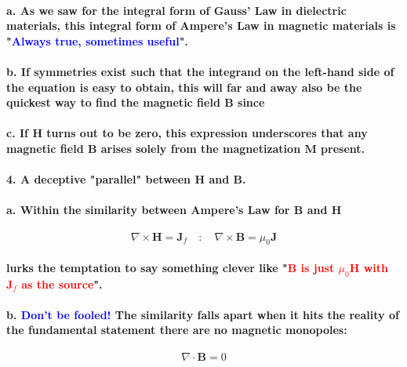 \documentclass{article}
\begin{document}
\paragraph{\indent a. As we saw for the integral form of Gauss' Law in dielectric materials, this integral form of Ampere's Law in magnetic materials is "\textcolor{blue}{Always true, sometimes useful}".}
\paragraph{\indent b. If symmetries exist such that the integrand on the left-hand side of the equation is easy to obtain, this will far and away also be the quickest way to find the magnetic field $\boldsymbol{B}$ since}
\paragraph{\indent c. If $\boldsymbol{H}$ turns out to be zero, this expression underscores that any magnetic field $\boldsymbol{B}$ arises solely from the magnetization $\boldsymbol{M}$ present.}
\paragraph{4. A deceptive "parallel" between $\boldsymbol{H}$ and $\boldsymbol{B}$.}
\paragraph{\indent a. Within the similarity between Ampere's Law for $\boldsymbol{B}$ and $\boldsymbol{H}$}
\begin{equation*}
    \nabla\times\boldsymbol{H}=\boldsymbol{J}_f\quad:\quad \nabla\times\boldsymbol{B}=\mu_0\boldsymbol{J}
\end{equation*}
\paragraph{lurks the temptation to say something clever like "\textcolor{red}{$\boldsymbol{B}$ is just $\mu_0\boldsymbol{H}$ with $\boldsymbol{J}_f$ as the source}".}
\paragraph{\indent b. \textcolor{blue}{Don't be fooled!} The similarity falls apart when it hits the reality of the fundamental statement there are no magnetic monopoles:}
\begin{equation*}
    \nabla\cdot\boldsymbol{B}=0
\end{equation*}
\end{document}
